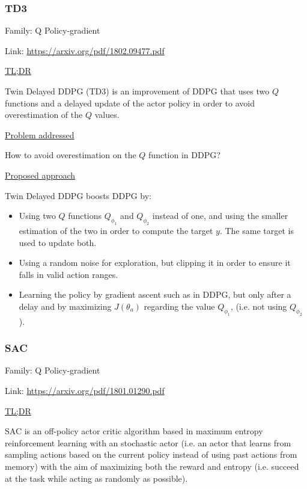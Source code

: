 \documentclass[12pt, english]{article}
\begin{document}
\subsubsection{TD3}
\label{TD3}

Family: Q Policy-gradient

Link: \url{https://arxiv.org/pdf/1802.09477.pdf}

\underline{TL;DR}

Twin Delayed DDPG (TD3) \cite{fujimoto_addressing_2018} is an improvement of DDPG that uses two $Q$ functions and a delayed update of the actor policy in order to avoid overestimation of the $Q$ values.

\underline{Problem addressed}

How to avoid overestimation on the $Q$ function in DDPG?

\underline{Proposed approach}

Twin Delayed DDPG boosts DDPG by:

\begin{itemize}
  \item Using two $Q$ functions $Q_{\phi_1}$ and $Q_{\phi_2}$ instead of one, and using the smaller estimation of the two in order to compute the target $y$. The same target is used to update both.
  \item Using a random noise for exploration, but clipping it in order to ensure it falls in valid action ranges.
  \item Learning the policy by gradient ascent such as in DDPG, but only after a delay and by maximizing $J(\theta_a)$ regarding the value $Q_{\phi_1}$, (i.e. not using $Q_{\phi_2}$).
\end{itemize}


\subsubsection{SAC}
\label{SAC}

Family: Q Policy-gradient

Link: \url{https://arxiv.org/pdf/1801.01290.pdf}

\underline{TL;DR}

SAC \cite{haarnoja_soft_2018} is an off-policy actor critic algorithm based in maximum entropy reinforcement learning with an stochastic actor (i.e. an actor that learns from sampling actions based on the current policy instead of using past actions from memory) with the aim of maximizing both the reward and entropy (i.e. succeed at the task while acting as randomly as possible).
\end{document}
